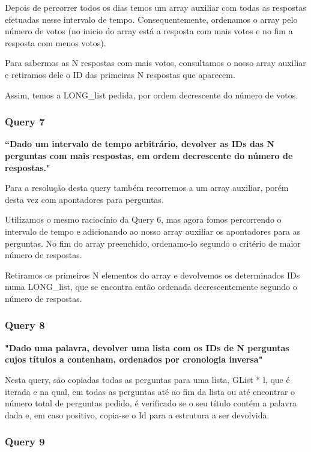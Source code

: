\documentclass[a4paper]{article}
\begin{document}
Depois de percorrer todos os dias temos um array auxiliar com todas as respostas
efetuadas nesse intervalo de tempo. Consequentemente, ordenamos o array pelo número
de votos (no inicio do array está a resposta com mais votos e no fim a resposta com menos votos).

Para sabermos as N respostas com mais votos, consultamos o nosso array auxiliar
e retiramos dele o ID das primeiras N respostas que aparecem.

Assim, temos a LONG\_list pedida, por ordem decrescente do número de votos.


\subsubsection*{Query 7}
\label{sec:query7}

\textbf{“Dado um intervalo de tempo arbitrário, devolver as IDs das N perguntas
com mais respostas, em ordem decrescente do número de respostas."}

Para a resolução desta query também recorremos a um array auxiliar, porém
desta vez com apontadores para perguntas.

Utilizamos o mesmo raciocínio da Query 6, mas agora fomos percorrendo o intervalo
de tempo e adicionando ao nosso array auxiliar os apontadores para as perguntas.
No fim do array preenchido, ordenamo-lo segundo o critério de maior número de respostas.

Retiramos os primeiros N elementos do array e devolvemos os determinados IDs
numa LONG\_list, que se encontra então ordenada decrescentemente segundo o número de respostas.


\subsubsection*{Query 8}
\label{sec:query8}

\textbf{"Dado uma palavra, devolver uma lista com os IDs de
N perguntas cujos títulos a contenham, ordenados por cronologia inversa"}

Nesta query, são copiadas todas as perguntas para uma lista, GList * l, que é iterada
e na qual, em todas as perguntas até ao fim da lista ou até encontrar o número total de
perguntas pedido, é verificado se o seu título contém a palavra dada e, em caso positivo,
copia-se o Id para a estrutura a ser devolvida.



\subsubsection*{Query 9}
\label{sec:query9}
\end{document}
